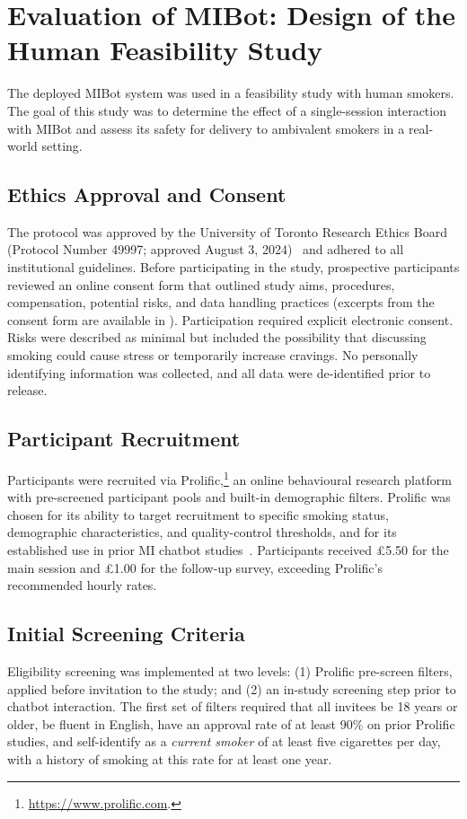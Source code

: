 \chapter{Evaluation of MIBot: Design of the Human Feasibility Study}
\label{ch:mibot-feasibility-study}
The deployed MIBot system was used in a feasibility study with human smokers. The goal of this study was to determine the effect of a single-session interaction with MIBot and assess its safety for delivery to ambivalent smokers in a real-world setting.

\section{Ethics Approval and Consent}
The protocol was approved by the University of Toronto Research Ethics Board (Protocol Number 49997; approved August 3, 2024)~\citep{rose2025ethics} and adhered to all institutional guidelines. Before participating in the study, prospective participants reviewed an online consent form that outlined study aims, procedures, compensation, potential risks, and data handling practices (excerpts from the consent form are available in ). Participation required explicit electronic consent. Risks were described as minimal but included the possibility that discussing smoking could cause stress or temporarily increase cravings. No personally identifying information was collected, and all data were de-identified prior to release.

\section{Participant Recruitment}
\label{sec:recruitment}
Participants were recruited via Prolific,\footnote{\url{https://www.prolific.com}.} an online behavioural research platform with pre-screened participant pools and built-in demographic filters. Prolific was chosen for its ability to target recruitment to specific smoking status, demographic characteristics, and quality-control thresholds, and for its established use in prior MI chatbot studies~\citep{brown2023mi,info:doi/10.2196/20251}. Participants received \pounds5.50 for the main session and \pounds1.00 for the follow-up survey, exceeding Prolific's recommended hourly rates.


\section{Initial Screening Criteria}
Eligibility screening was implemented at two levels: (1) Prolific pre-screen filters, applied before invitation to the study; and (2) an in-study screening step prior to chatbot interaction. The first set of filters required that all invitees be 18 years or older, be fluent in English, have an approval rate of at least 90\% on prior Prolific studies, and self-identify as a \emph{current smoker} of at least five cigarettes per day, with a history of smoking at this rate for at least one year.

